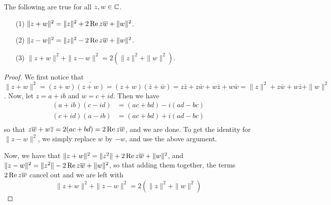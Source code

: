 \begin{lemma}\label{1.1.5}
    The following are true for all $z,w \in \mathbb{C}$.
    \begin{enumerate}
        \item[(1)] $\|z+w\|^2=\|z\|^2+2\operatorname{Re}{z\overline{w}}+\|w\|^2$.

        \item[(2)] $\|z-w\|^2=\|z\|^2-2\operatorname{Re}{z\overline{w}}+\|w\|^2$.

        \item[(3)] $\|z+w\|^2+\|z-w\|^2=2(\|z\|^2+\|w\|^2)$.
    \end{enumerate}
\end{lemma}
\begin{proof}
    We first notice that
    $\|z+w\|^2=(z+w)\bar{(z+w)}=(z+w)(\bar{z}+\bar{w})=z\bar{z}+z\bar{w}+w\bar{z}+
    w\bar{w}=\|z\|^2+z\bar{w}+w\bar{z}+\|w\|^2$. Now, let $z=a+ib$ and
    $w=c+id$. Then we have
    \begin{align*}
        (a+ib)(c-id)    &=  (ac+bd)-i(ad-bc)    \\
        (c+id)(a-ib)    &=  (ac+bd)+i(ad-bc)    \\
    \end{align*}
    so that $z\overline{w}+w\overline{z}=2(ac+bd)=2\operatorname{Re}{z\overline{w}}$, and we are done. To get
    the identity for $\|z-w\|^2$, we simply replace $w$ by  $-w$, and use the
    above argument.

    Now, we have that  $\|z+w\|^2=\|z^2\|+2\operatorname{Re}{z\overline{w}}+\|w\|^2$, and
    $\|z-w\|^2=\|z^2\|-2\operatorname{Re}{z\overline{w}}+\|w\|^2$, so that adding them together,
    the terms $2\operatorname{Re}{z\overline{w}}$ cancel out and we are left with
    \begin{equation*}
        \|z+w\|^2+\|z-w\|^2=2(\|z\|^2+\|w\|^2)
    \end{equation*}
\end{proof}

